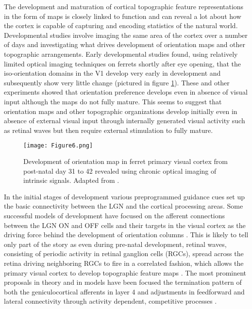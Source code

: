 The development and maturation of cortical topographic feature
representations in the form of maps is closely linked to function and
can reveal a lot about how the cortex is capable of capturing and
encoding statistics of the natural world. Developmental studies
involve imaging the same area of the cortex over a number of days and
investigating what drives development of orientation maps and other
topographic arrangements. Early developmental studies found, using
relatively limited optical imaging techniques on ferrets shortly after
eye opening, that the iso-orientation domains in the V1 develop very
early in development and subsequently show very little change
\citep{Chapman1996} (pictured in figure \ref{RFMapDevelopment}). These
and other experiments \citep{White2007} showed that orientation
preference develops even in absence of visual input although the maps
do not fully mature. This seems to suggest that orientation maps and
other topographic organizations develop initially even in absence of
external visual input through internally generated visual activity
such as retinal waves but then require external stimulation to fully
mature.

\begin{figure}
	\centering \texttt{[image: Figure6.png]}
	\caption[Development of an orientation map in ferret V1. Adapted
      from \citep{Chapman1996}.]{Development of orientation map in
      ferret primary visual cortex from post-natal day 31 to 42
      revealed using chronic optical imaging of intrinsic
      signals. Adapted from \citep{Chapman1996}.}
	\label{RFMapDevelopment}
\end{figure}

In the initial stages of development various preprogrammed guidance
cues set up the basic connectivity between the LGN and the cortical
processing areas. Some successful models of development have focused
on the afferent connections between the LGN ON and OFF cells and their
targets in the visual cortex as the driving force behind the
development of orientation columns \citep{Jin2011}. This is likely to
tell only part of the story as even during pre-natal development,
retinal waves, consisting of periodic activity in retinal ganglion
cells (RGCs), spread across the retina driving neighboring RGCs to
fire in a correlated fashion, which allows the primary visual cortex
to develop topographic feature maps \citep{Firth2005}. The most
prominent proposals in theory and in models have been focused the
termination pattern of both the geniculocortical afferents in layer 4
\citep{Katz2000,Ringach2007} and adjustments in feedforward and
lateral connectivity through activity dependent, competitive processes
\citep{Bednar2003}.

